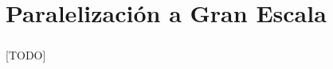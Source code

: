 \documentclass{subfiles}
\begin{document}
  \chapter{Paralelización a Gran Escala}
  \label{chap:parallel}

    \paragraph{}
    [TODO]
\end{document}
